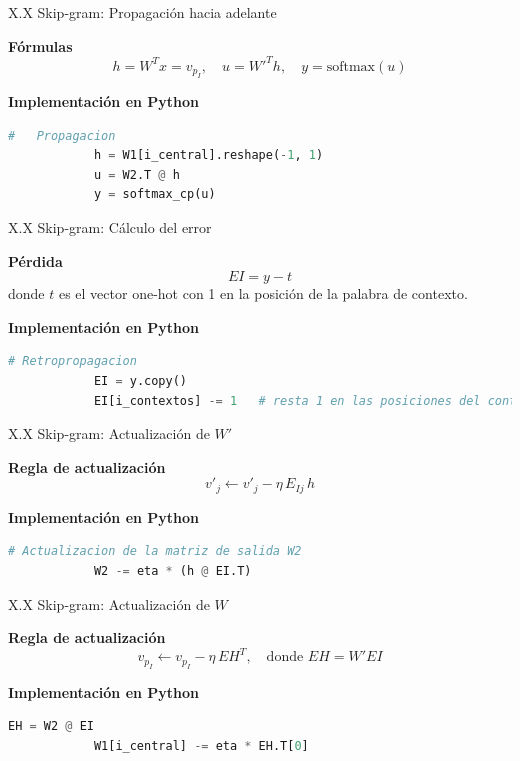 \documentclass{beamer}
\begin{document}
\begin{frame}[fragile]{X.X Skip-gram: Propagación hacia adelante}
	\begin{block}{\textbf{Fórmulas}}
		\[
		h = W^T x = v_{p_I}, \quad
		u = W'^T h, \quad
		y = \text{softmax}(u)
		\]
	\end{block}
	
	\begin{block}{\textbf{Implementación en Python}}
		\begin{lstlisting}[language=Python]
			#   Propagacion  
			h = W1[i_central].reshape(-1, 1)   
			u = W2.T @ h                        
			y = softmax_cp(u)                 
		\end{lstlisting}
	\end{block}
\end{frame}

\begin{frame}[fragile]{X.X Skip-gram: Cálculo del error}
	\begin{block}{\textbf{Pérdida}}
		\[
		EI = y - t
		\]
		donde $t$ es el vector one-hot con 1 en la posición de la palabra de contexto.
	\end{block}
	
	\begin{block}{\textbf{Implementación en Python}}
		\begin{lstlisting}[language=Python]
			# Retropropagacion 
			EI = y.copy()
			EI[i_contextos] -= 1   # resta 1 en las posiciones del contexto
		\end{lstlisting}
	\end{block}
\end{frame}

\begin{frame}[fragile]{X.X Skip-gram: Actualización de $W'$}
	\begin{block}{\textbf{Regla de actualización}}
		\[
		v'_j \leftarrow v'_j - \eta \, E_{Ij} \, h
		\]
	\end{block}
	
	\begin{block}{\textbf{Implementación en Python}}
		\begin{lstlisting}[language=Python]
			# Actualizacion de la matriz de salida W2
			W2 -= eta * (h @ EI.T)
		\end{lstlisting}
	\end{block}
\end{frame}

\begin{frame}[fragile]{X.X Skip-gram: Actualización de $W$}
	\begin{block}{\textbf{Regla de actualización}}
		\[
		v_{p_I} \leftarrow v_{p_I} - \eta \, EH^T, 
		\quad \text{donde } EH = W' EI
		\]
	\end{block}
	
	\begin{block}{\textbf{Implementación en Python}}
		\begin{lstlisting}[language=Python]
			EH = W2 @ EI
			W1[i_central] -= eta * EH.T[0]
		\end{lstlisting}
	\end{block}
\end{frame}
	
	
	
\end{document}
